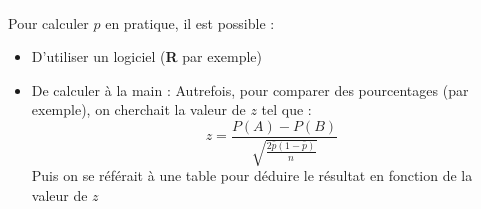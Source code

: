 \textcolor{white}{.}\newline
\\
Pour calculer $p$ en pratique, il est possible : 
\begin{itemize}
\item D'utiliser un logiciel (\textbf{R} par exemple)
\item De calculer à la main : \newline
Autrefois, pour comparer des pourcentages 
(par exemple), on cherchait la valeur de $z$ tel que : 
$$z=\frac{P(A)-P(B)}{\sqrt{\frac{2\bar{p}(1-\bar{p})}{n}}}$$
Puis on se référait à une table pour déduire le résultat en fonction de la valeur de $z$
\end{itemize}

